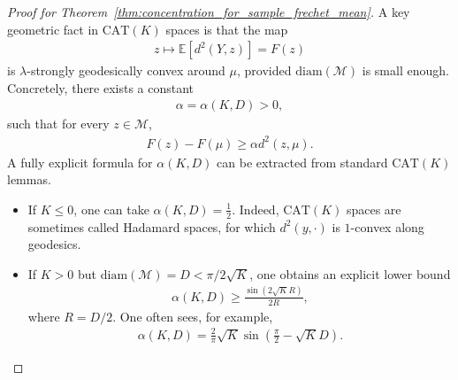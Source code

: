 \begin{proof}[Proof for Theorem~\ref{thm:concentration_for_sample_frechet_mean}]
    A key geometric fact in $\mathrm{CAT}(K)$ spaces is that the map
    \begin{align*}
        z \mapsto \mathbb{E}[d^2(Y, z)] = F(z)
    \end{align*}
    is $\lambda$-strongly geodesically convex around $\mu$, provided $\mathrm{diam}(\mathcal{M})$ is small enough.
    Concretely, there exists a constant
    \begin{align*}
        \alpha = \alpha(K, D) > 0,
    \end{align*}
    such that for every $z \in \mathcal{M}$,
    \begin{align*}
        F(z) - F(\mu) \geq \alpha d^2(z, \mu).
    \end{align*}
    A fully explicit formula for $\alpha(K, D)$ can be extracted from standard $\mathrm{CAT}(K)$ lemmas.
    \begin{itemize}
        \item If $K \leq 0$, one can take $\alpha(K, D) = \frac{1}{2}$. Indeed, $\mathrm{CAT}(K)$ spaces are sometimes called Hadamard spaces, for which $d^2(y, \cdot)$ is $1$-convex along geodesics.
        \item If $K > 0$ but $\mathrm{diam}(\mathcal{M}) = D < \pi / 2\sqrt{K}$, one obtains an explicit lower bound
        \begin{align*}
            \alpha(K, D) \geq \frac{\sin(2\sqrt{K}R)}{2R},
        \end{align*}
        where $R = D / 2$.
        One often sees, for example,
        \begin{align*}
            \alpha(K, D) = \frac{2}{\pi}\sqrt{K}\sin\left(\frac{\pi}{2} - \sqrt{K}D\right).
        \end{align*}
    \end{itemize}


\end{proof}
